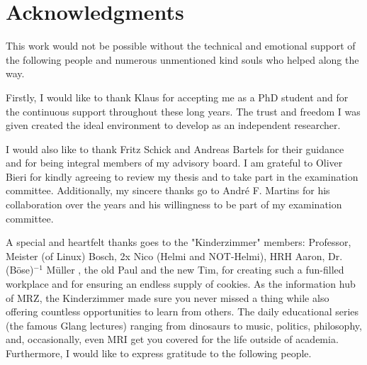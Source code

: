 

\chapter{Acknowledgments}
\vspace*{-0.4cm}
This work would not be possible without the technical and emotional support of the following people and numerous unmentioned kind souls who helped along the way.

Firstly, I would like to thank Klaus for accepting me as a PhD student and for the continuous support throughout these long years. The trust and freedom I was given created the ideal environment to develop as an independent researcher.

I would also like to thank Fritz Schick and Andreas Bartels for their guidance and for being integral members of my advisory board. I am grateful to Oliver Bieri for kindly agreeing to review my thesis and to take part in the examination committee. Additionally, my sincere thanks go to André F. Martins for his collaboration over the years and his willingness to be part of my examination committee.

A special and heartfelt thanks goes to the "Kinderzimmer" members: Professor, Meister (of Linux) Bosch, 2x Nico (Helmi and NOT-Helmi), HRH Aaron, Dr. (B\"ose)$^{-1}$ M\"uller , the old Paul and the new Tim, for creating such a fun-filled workplace and for ensuring an endless supply of cookies. As the information hub of MRZ, the Kinderzimmer made sure you never missed a thing while also offering countless opportunities to learn from others. The daily educational series (the famous Glang lectures) ranging from dinosaurs to music, politics, philosophy, and, occasionally, even MRI get you covered for the life outside of academia. Furthermore, I would like to express gratitude to the following people.

